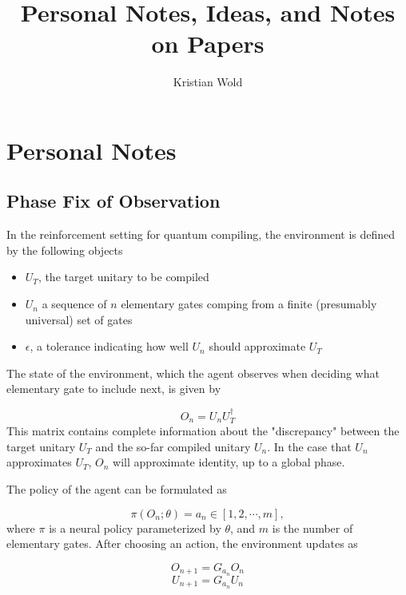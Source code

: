 \documentclass{article}
\title{Personal Notes, Ideas, and Notes on Papers}
\author{Kristian Wold}
\begin{document}
\maketitle

\section{Personal Notes}

\subsection{Phase Fix of Observation}

In the reinforcement setting for quantum compiling, the environment is defined by the following objects

\begin{itemize}
    \item $U_T$, the target unitary to be compiled
    \item $U_n$ a sequence of $n$ elementary gates comping from a finite (presumably universal) set of gates
    \item $\epsilon$, a tolerance indicating how well $U_n$ should approximate $U_T$
\end{itemize}

The state of the environment, which the agent observes when deciding what elementary gate to include next, is given by

\begin{equation*}
    O_n = U_n U_T^{\dagger}
\end{equation*}
This matrix contains complete information about the "discrepancy" between the target unitary $U_T$ and the so-far compiled unitary $U_n$. In the case that $U_n$ approximates $U_T$, $O_n$ will approximate identity, up to a global phase.

The policy of the agent can be formulated as

\begin{equation*}
    \pi(O_n; \theta) = a_n \in [1,2, \cdots , m],
\end{equation*}
where $\pi$ is a neural policy parameterized by $\theta$, and $m$  is the number of elementary gates. After choosing an action, the environment updates as 

\begin{equation*}
    O_{n+1} = G_{a_{n}}O_{n}
\end{equation*}
\begin{equation*}
    U_{n+1} = G_{a_{n}}U_{n}
\end{equation*} 
\end{document}

